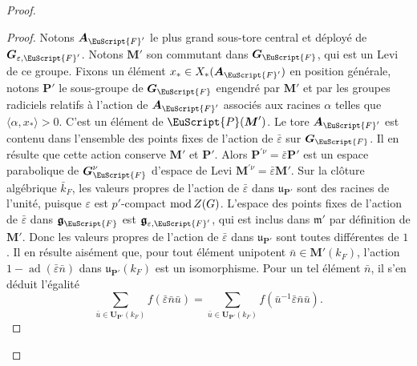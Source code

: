 \documentclass[JEP,XML,SOM,Unicode,francais]{cedram}
\let\mathcal \EuScript
\let\epsilon\varepsilon
\let\<\langle
\let\>\rangle
\newcommand{\rmod}{\textup{mod}\,}
\newcommand{\frg}{\mathfrak{g}}
\newcommand{\mfrm}{\mathfrak{m}}
\newcommand{\fru}{\mathfrak{u}}
\DeclareMathOperator{\ad}{ad}
\newcommand{\bA}{\boldsymbol{A}}
\newcommand{\bG}{\boldsymbol{G}}
\newcommand{\bM}{\boldsymbol{M}}
\newcommand{\bP}{\boldsymbol{P}}
\newcommand{\bU}{\boldsymbol{U}}
\newcommand{\cF}{\mathcal{F}}
\newcommand{\cP}{\mathcal{P}}
\theoremstyle{plain}
\theoremstyle{definition}
\begin{document}
\begin{proof}
\begin{proof}
Notons $\bA_{\cF'}$ le plus grand sous-tore central et déployé de $\bG_{\epsilon,\cF'}$. Notons $\bM'$ son commutant dans $\bG_{\cF}$, qui est un Levi de ce groupe. Fixons un élément $x_{*}\in X_{*}(\bA_{\cF'})$ en position générale, notons $\bP'$ le sous-groupe de $\bG_{\cF}$ engendré par $\bM'$ et par les groupes radiciels relatifs à l'action de $\bA_{\cF'}$ associés aux racines $\alpha$ telles que $\<\alpha,x_{*}\>>0$. C'est un élément de $\cP(\bM')$.
Le tore $\bA_{\cF'}$ est contenu dans l'ensemble des points fixes de l'action de $\bar{\epsilon}$ sur $\bG_{\cF}$. Il en résulte que cette action conserve $\bM'$ et $\bP'$. Alors $\bP^{\prime\nu}=\bar{\epsilon}\bP'$ est un espace parabolique de $\bG^{\nu}_{\cF}$ d'espace de Levi $\bM^{\prime\nu}=\bar{\epsilon}\bM'$. Sur la clôture algébrique $\bar{k}_{F}$, les valeurs propres de l'action de $\bar{\epsilon}$ dans $\boldsymbol{\fru}_{\bP'}$ sont des racines de l'unité, puisque $\epsilon$ est $p'$-compact $\rmod Z(G)$. L'espace des points fixes de l'action de $\bar{\epsilon}$ dans $\boldsymbol{\frg}_{\cF}$ est $\boldsymbol{\frg}_{\epsilon,\cF'}$, qui est inclus dans $\boldsymbol{\mfrm}'$ par définition de $\bM'$. Donc les valeurs propres de l'action de $\bar{\epsilon}$ dans $\boldsymbol{\fru}_{\bP'}$ sont toutes différentes de $1$. Il en résulte aisément que, pour tout élément unipotent $\bar{n}\in \bM'(k_{F})$, l'action $1-\ad(\bar{\epsilon}\bar{n})$ dans $\boldsymbol{\fru}_{\bP'}(k_{F})$ est un isomorphisme. Pour un tel élément $\bar{n}$, il s'en déduit l'égalité\vspace*{-3pt}\enlargethispage{.2\baselineskip}%
\[
\sum_{\bar{u}\in \bU_{\bP'}(k_{F})}f(\bar{\epsilon}\bar{n}\bar{u})=\sum_{\bar{u}\in \bU_{\bP'}(k_{F})}f(\bar{u}^{-1}\bar{\epsilon}\bar{n}\bar{u}).
\]

\end{proof}
\end{proof}
\end{document}
